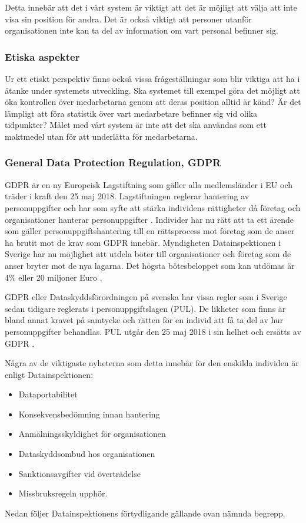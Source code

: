 \documentclass[swedish, a4paper,12pt]{article}
\begin{document}
Detta innebär att det i vårt system är viktigt att det är möjligt att välja att inte visa sin position för andra. Det är också viktigt att personer utanför organisationen inte kan ta del av information om vart personal befinner sig.

\newpage
\subsubsection{Etiska aspekter}
Ur ett etiskt perspektiv finns också vissa frågeställningar som blir viktiga att ha i åtanke under systemets utveckling. Ska systemet till exempel göra det möjligt att öka kontrollen över medarbetarna genom att deras position alltid är känd? Är det lämpligt att föra statistik över vart medarbetare befinner sig vid olika tidpunkter?
Målet med vårt system är inte att det ska användas som ett maktmedel utan för att underlätta för medarbetarna.

\subsubsection{General Data Protection Regulation, GDPR}
GDPR är en ny Europeisk Lagstiftning som gäller alla medlemsländer i EU och träder i kraft den 25 maj 2018.
Lagstiftningen reglerar hantering av personuppgifter och har som syfte att stärka individens rättigheter då företag och organisationer hanterar personuppgifter \cite{GDPRibm} \cite{GDPRdatainspektionen}.
Individer har nu rätt att ta ett ärende som gäller personuppgiftshantering till en rättsprocess mot företag som de anser ha brutit mot de krav som GDPR innebär.
Myndigheten Datainspektionen i Sverige har nu möjlighet att utdela böter till organisationer och företag som de anser bryter mot de nya lagarna. Det högsta bötesbeloppet som kan utdömas är 4\% eller 20 miljoner Euro \cite{GDPRibm}.

GDPR eller Dataskyddsförordningen på svenska har vissa regler som i Sverige sedan tidigare reglerats i personuppgiftslagen (PUL). De likheter som finns är bland annat kravet på samtycke och rätten för en individ att få ta del av hur personuppgifter behandlas. PUL utgår den 25 maj 2018 i sin helhet och ersätts av GDPR \cite{GDPRdatainspektionen}.

Några av de viktigaste nyheterna som detta innebär för den enskilda individen är enligt Datainspektionen\cite{GDPRdatainspektionen}:
\begin{itemize}
  \item Dataportabilitet
  \item Konsekvensbedömning innan hantering
  \item Anmälningsskyldighet för organisationen
  \item Dataskyddsombud hos organisationen
  \item Sanktionsavgifter vid överträdelse
  \item Missbruksregeln upphör.
\end{itemize}
\newpage
Nedan följer Datainspektionens \cite{GDPRdatainspektionen} förtydligande gällande ovan nämnda begrepp.
\end{document}

